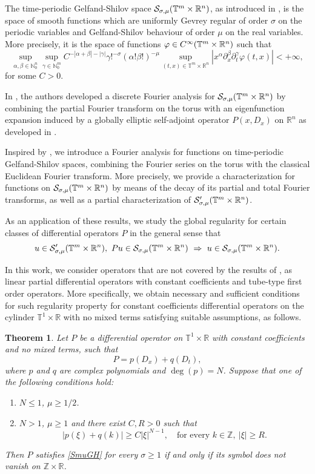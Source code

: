 \documentclass[11pt,reqno]{amsart}
\newtheorem{theorem}{Theorem}[section]
\numberwithin{equation}{section}
\theoremstyle{definition}
\theoremstyle{definition}
\newcommand{\T}{\mathbb{T}}
\newcommand{\G}{\mathnormal{\mathbb{T}^{m}\times\mathbb{R}^n}}
\newcommand{\R}{\mathbb{R}}
\newcommand{\Z}{\mathbb{Z}}
\newcommand{\N}{\mathbb{N}}
\renewcommand{\S}{\mathcal{S}_{\sigma,\mu}(\G)}
\renewcommand{\SS}{\mathcal{S}'_{\sigma,\mu}(\G)}
\begin{document}
The time-periodic Gelfand-Shilov space $\S$, as introduced in \cite{AvCap2022}, is the space of smooth functions which are uniformly Gevrey regular of order $\sigma$ on the periodic variables and Gelfand-Shilov behaviour of order $\mu$ on the real variables. 
More precisely, it is the space of functions $\varphi\in C^\infty(\G)$ such that
\[\sup_{\alpha,\beta\in\N_0^n}\sup_{\gamma\in \N_0^m} C^{-|\alpha+\beta|-|\gamma|}\gamma!^{-\sigma}(\alpha!\beta!)^{-\mu}\sup_{(t,x)\in\T^m\times\R^n}|x^\alpha\partial_x^\beta\partial_t^\gamma \varphi(t,x)|<+\infty,\]
for some $C>0$.

In \cite{AvCap2022}, the authors developed a discrete Fourier analysis for $\S$ by combining the partial Fourier transform on the torus with an eigenfunction expansion induced by a globally elliptic self-adjoint operator $P(x,D_x)$ on $\R^n$ as developed in \cite{GPR2011}.

Inspired by \cite{KowTmRn,Kow_chap}, we introduce a Fourier analysis for functions on time-periodic Gelfand-Shilov spaces, combining the Fourier series on the torus with the classical Euclidean  Fourier transform. More precisely, we provide a characterization for functions on $\S$ by means of the decay of its partial and total Fourier transforms, as well as a partial characterization of $\SS$.

As an application of these results, we study the global regularity for certain classes of differential operators $P$ in the general sense that
\begin{equation}\label{SmuGH}
    u\in\SS,\ Pu\in\S\ \Rightarrow\ u\in\S.
\end{equation}

 In this work, we consider operators that are not covered by the results of \cite{AvCap2022,AvCap2025,AvCapKir2024}, as linear partial differential operators with constant coefficients and tube-type first order operators. More specifically, we obtain necessary and sufficient conditions for such regularity property for constant coefficients differential operators on the cylinder $\T^1\times\R$ with no mixed terms satisfying suitable assumptions, as follows.

\begin{theorem}\label{theo_gh_cte_intro}
    Let $P$ be a differential operator on $\T^1\times\R$ with constant coefficients and no mixed terms, such that  $$P=p\left(D_x\right)+q\left(D_t\right),$$
    where $p$ and $q$ are complex polynomials and $\deg(p)=N$. Suppose that one of the following conditions hold:
   \begin{enumerate}
       \item $N\leq 1$, $\mu\geq 1/2$.
       \item $N>1$, $\mu\geq 1$ and there exist $C,R>0$ such that
       \begin{equation*}
       |p(\xi)+q(k)|\geq C|\xi|^{N-1},\quad \text{for every } k\in\Z,\ |\xi|\geq R. 
       \end{equation*}
   \end{enumerate}
   
   Then $P$ satisfies \eqref{SmuGH} for every $\sigma\geq 1$ if and only if its symbol does not vanish on $\Z\times \R$.
\end{theorem}
\end{document}
